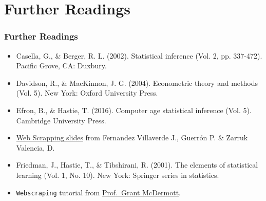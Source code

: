 \documentclass[
  shownotes,
  xcolor={svgnames},
  hyperref={colorlinks,citecolor=DarkBlue,linkcolor=DarkRed,urlcolor=DarkBlue}
  , aspectratio=169]{beamer}
\begin{document}

\section{Further Readings}
\begin{frame}
\frametitle{Further Readings}
\footnotesize
\begin{itemize}
  \item Casella, G., \& Berger, R. L. (2002). Statistical inference (Vol. 2, pp. 337-472). Pacific Grove, CA: Duxbury.
  \medskip
   \item Davidson, R., \& MacKinnon, J. G. (2004). Econometric theory and methods (Vol. 5). New York: Oxford University Press.
  \medskip
  \item Efron, B., \& Hastie, T. (2016). Computer age statistical inference (Vol. 5). Cambridge University Press.
  \medskip
  \item \href{https://www.sas.upenn.edu/~jesusfv/Lecture_HPC_10_Web_Scrapping.pdf}{Web Scrapping slides} from Fernandez Villaverde J., Guerrón P. \& Zarruk Valencia, D. 
  \medskip
  \item Friedman, J., Hastie, T., \& Tibshirani, R. (2001). The elements of statistical learning (Vol. 1, No. 10). New York: Springer series in statistics.
  \medskip
  \item \texttt{Webscraping} tutorial from  \href{https://grantmcdermott.com/}{Prof.~Grant McDermott}.
  
  
\end{itemize}

\end{frame}

\end{document}
